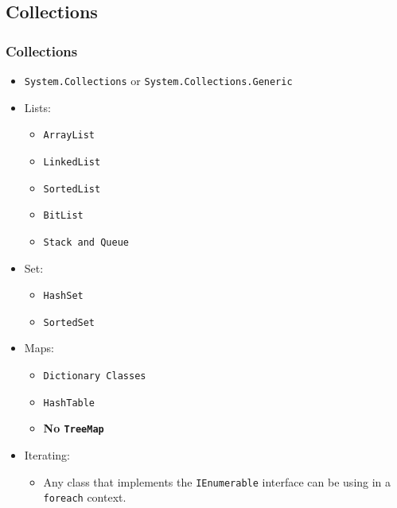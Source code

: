 \documentclass{beamer}
\begin{document}
\subsection{Collections}
\begin{frame}
\frametitle{Collections}
\scriptsize
\begin{itemize}
\item \texttt{System.Collections} or \texttt{System.Collections.Generic}
\item Lists:
\begin{itemize}
\scriptsize
\item \texttt{ArrayList}
\item \texttt{LinkedList}
\item \texttt{SortedList}
\item \texttt{BitList}
\item \texttt{Stack and Queue}
\end{itemize}
\item Set:
\begin{itemize}
\scriptsize
\item \texttt{HashSet}
\item \texttt{SortedSet}
\end{itemize}
\item Maps:
\begin{itemize}
\scriptsize
\item \texttt{Dictionary Classes}
\item \texttt{HashTable}
\item \textbf{No \texttt{TreeMap}}
\end{itemize}
\item Iterating:
\begin{itemize}
\scriptsize
\item Any class that implements the \texttt{IEnumerable} interface can be using in a \texttt{foreach} context.
\iter
\end{itemize}
\end{itemize}
\end{frame}
\end{document}
